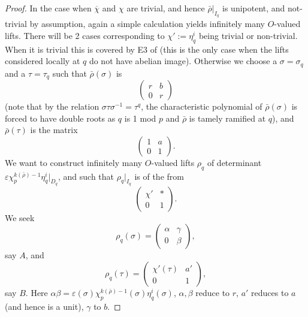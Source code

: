 \documentclass[12pt]{amsart}
\newcommand{\rhobar}{\overline{\rho}}
\def\rhobar{ {\bar {\rho} } }
\def\rhob{ {\bar {\rho} } }
\newcommand{\vep}{{\varepsilon}}
\begin{document}
\begin{proof}
In the case when $\overline{\chi}$ and $\chi$ are  trivial, and hence $\rhobar|_{I_q}$ is unipotent, and not-trivial by 
assumption, again a simple calculation yields infinitely many $O$-valued lifts.
There will be 2 cases corresponding to $\chi':=\eta_q^i$ being trivial or non-trivial.
When it is trivial this is covered by E3 of \cite{Tay3} (this is the only case when the lifts considered locally at $q$ do not have abelian image). Otherwise we choose a $\sigma=\sigma_q$ and a $\tau=\tau_q$ such that
$\rhobar(\sigma)$ is $$\left( \begin{array}{cc}
     r  & b  \\
    0 & r
\end{array} \right)$$ (note that by the relation $\sigma\tau\sigma^{-1}=\tau^q$, the characteristic polynomial 
of $\rhobar(\sigma)$ is forced to have double roots as $q$ is 1 mod $p$ and 
$\rhobar$ is tamely ramified at $q$), and $\rhobar(\tau)$ is the matrix $$\left( \begin{array}{cc}
     1  & a  \\
    0 & 1
\end{array} \right).$$  We want to construct infinitely many $O$-valued lifts $\rho_q$ of determinant 
$\vep\chi_p^{k(\rhob)-1}\eta_q^i|_{D_q}$, and such that
$\rho_q|_{I_q}$ is of the from
$$\left( \begin{array}{cc}
     \chi'  & *  \\
    0 & 1
\end{array} \right).$$ We seek $$\rho_q(\sigma)=\left( \begin{array}{cc}
     \alpha  & \gamma  \\
    0 & \beta
\end{array} \right),$$ say $A$, and $$\rho_q(\tau)=\left( \begin{array}{cc}
     \chi'(\tau)  & a'  \\
    0 & 1
\end{array} \right),$$ say $B$. 
Here  $\alpha\beta=\vep(\sigma)\chi_p^{k(\rhobar)-1}(\sigma)\eta_q^i(\sigma)$, $\alpha,\beta$ reduce to $r$, $a'$ reduces to $a$ (and hence is a unit), $\gamma$ 
to $b$. 

\end{proof}
\end{document}
